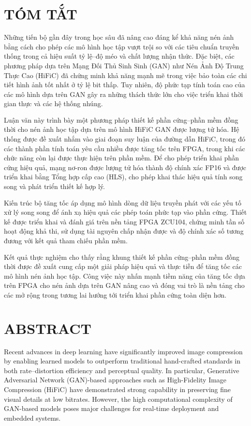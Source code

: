 \section*{TÓM TẮT}
Những tiến bộ gần đây trong học sâu đã nâng cao đáng kể khả năng nén ảnh bằng cách cho phép các mô hình học tập vượt trội so với các tiêu chuẩn truyền thống trong cả hiệu suất tỷ lệ--độ méo và chất lượng nhận thức. Đặc biệt, các phương pháp dựa trên Mạng Đối Thủ Sinh Sinh (GAN) như Nén Ảnh Độ Trung Thực Cao (HiFiC) đã chứng minh khả năng mạnh mẽ trong việc bảo toàn các chi tiết hình ảnh tốt nhất ở tỷ lệ bit thấp. Tuy nhiên, độ phức tạp tính toán cao của các mô hình dựa trên GAN gây ra những thách thức lớn cho việc triển khai thời gian thực và các hệ thống nhúng.

Luận văn này trình bày một phương pháp thiết kế phần cứng--phần mềm đồng thời cho nén ảnh học tập dựa trên mô hình HiFiC GAN được lượng tử hóa. Hệ thống được đề xuất nhắm vào giai đoạn suy luận của đường dẫn HiFiC, trong đó các thành phần tính toán yêu cầu nhiều được tăng tốc trên FPGA, trong khi các chức năng còn lại được thực hiện trên phần mềm. Để cho phép triển khai phần cứng hiệu quả, mạng nơ-ron được lượng tử hóa thành độ chính xác FP16 và được triển khai bằng Tổng hợp cấp cao (HLS), cho phép khai thác hiệu quả tính song song và phát triển thiết kế hợp lý.

Kiến trúc bộ tăng tốc áp dụng mô hình dòng dữ liệu truyền phát với các yếu tố xử lý song song để ánh xạ hiệu quả các phép toán phức tạp vào phần cứng. Thiết kế được triển khai và đánh giá trên nền tảng FPGA ZCU104, chứng minh tần số hoạt động khả thi, sử dụng tài nguyên chấp nhận được và độ chính xác số tương đương với kết quả tham chiếu phần mềm.

Kết quả thực nghiệm cho thấy rằng khung thiết kế phần cứng--phần mềm đồng thời được đề xuất cung cấp một giải pháp hiệu quả và thực tiễn để tăng tốc các mô hình nén ảnh học tập. Công việc này nhấn mạnh tiềm năng của tăng tốc dựa trên FPGA cho nén ảnh dựa trên GAN nâng cao và đóng vai trò là nền tảng cho các mở rộng trong tương lai hướng tới triển khai phần cứng toàn diện hơn.
\cleardoublepage

\section*{ABSTRACT}
Recent advances in deep learning have significantly improved image compression by enabling learned models to outperform traditional hand-crafted standards in both rate--distortion efficiency and perceptual quality. In particular, Generative Adversarial Network (GAN)-based approaches such as High-Fidelity Image Compression (HiFiC) have demonstrated strong capability in preserving fine visual details at low bitrates. However, the high computational complexity of GAN-based models poses major challenges for real-time deployment and embedded systems.

